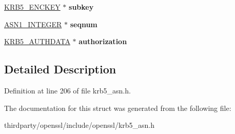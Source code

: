 \begin{DoxyCompactItemize}
\hyperlink{structkrb5__encryptionkey__st}{K\+R\+B5\+\_\+\+E\+N\+C\+K\+EY} $\ast$ {\bfseries subkey}
\item 
\mbox{\label{structkrb5__authenticator__st_a536a8d151e989aa249609ec5d482ed9c}} 
\hyperlink{structasn1__string__st}{A\+S\+N1\+\_\+\+I\+N\+T\+E\+G\+ER} $\ast$ {\bfseries seqnum}
\item 
\mbox{\label{structkrb5__authenticator__st_afbcfe629c218e03f97fecdfa8f594460}} 
\hyperlink{structkrb5__authorization__st}{K\+R\+B5\+\_\+\+A\+U\+T\+H\+D\+A\+TA} $\ast$ {\bfseries authorization}
\end{DoxyCompactItemize}


\subsection{Detailed Description}


Definition at line 206 of file krb5\+\_\+asn.\+h.



The documentation for this struct was generated from the following file\+:\begin{DoxyCompactItemize}
\item 
thirdparty/openssl/include/openssl/krb5\+\_\+asn.\+h\end{DoxyCompactItemize}
